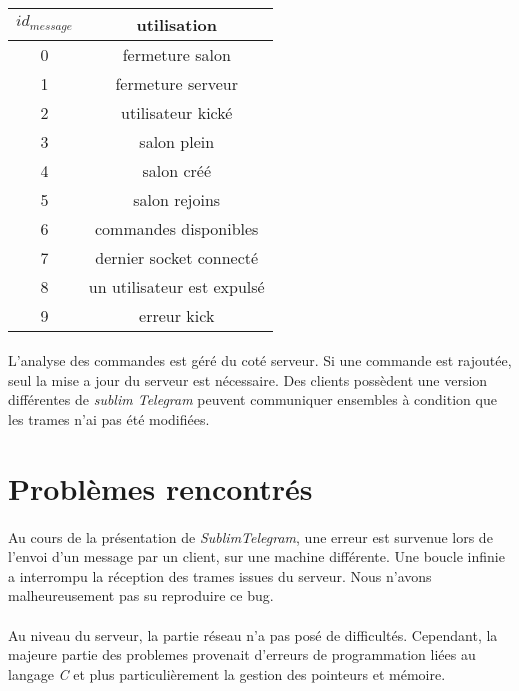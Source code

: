 \documentclass[a4paper, 12pt]{article}
\begin{document}
\paragraph{}
\begin{tabular}{|c|c|}
 \hline		
    $id_{message}$ & utilisation \\
 \hline		
    0 & fermeture salon \\
 \hline  
 	1 & fermeture serveur \\
 \hline
 	2 & utilisateur kické \\
 \hline
 	3 & salon plein \\
 \hline
 	4 & salon créé \\
 \hline
 	5 & salon rejoins \\
 \hline
    6 & commandes disponibles \\
 \hline
 	7 & dernier socket connecté \\
 \hline
 	8 & un utilisateur est expulsé \\
 \hline
    9 & erreur kick \\
 \hline
\end{tabular}
\paragraph{}
L'analyse des commandes est géré du coté serveur. Si une commande est rajoutée, seul la mise a jour du serveur est nécessaire. Des clients possèdent une version différentes de \emph{sublim Telegram} peuvent communiquer ensembles à condition que les trames n'ai pas été modifiées.
\section{Problèmes rencontrés}
\paragraph{}
Au cours de la présentation de \emph{SublimTelegram}, une erreur est survenue lors de l'envoi d'un message par un client, sur une machine différente. Une boucle infinie a interrompu la réception des trames issues du serveur. Nous n'avons malheureusement pas su reproduire ce bug.
\paragraph{}
Au niveau du serveur, la partie réseau n'a pas posé de difficultés. Cependant, la majeure partie des problemes provenait d'erreurs de programmation liées au langage \emph{C} et plus particulièrement la gestion des pointeurs et mémoire.
\end{document}
